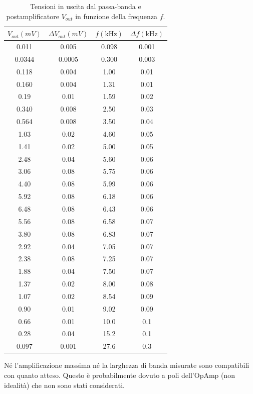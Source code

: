 \documentclass[10pt,a4paper]{article}
\begin{document}
\begin{table}[!htb]\centering
\begin{tabular}{|c|c|c|c|}
\hline
$V_{out} (mV)$ & $\Delta V_{out} (mV)$ & $f (\mbox{kHz})$ & $\Delta f (\mbox{kHz})$\\ 
\hline
0.011 & 0.005 & 0.098 & 0.001\\
0.0344 & 0.0005 & 0.300 & 0.003\\
0.118 & 0.004 & 1.00 & 0.01\\
0.160 & 0.004 & 1.31 & 0.01\\
0.19 & 0.01 & 1.59 & 0.02\\
0.340 & 0.008 & 2.50 & 0.03\\
0.564 & 0.008 & 3.50 & 0.04\\
1.03 & 0.02 & 4.60 & 0.05\\
1.41 & 0.02 & 5.00 & 0.05\\
2.48 & 0.04 & 5.60 & 0.06\\
3.06 & 0.08 & 5.75 & 0.06\\
4.40 & 0.08 & 5.99 & 0.06\\
5.92 & 0.08 & 6.18 & 0.06\\
6.48 & 0.08 & 6.43 & 0.06\\
5.56 & 0.08 & 6.58 & 0.07\\
3.80 & 0.08 & 6.83 & 0.07\\
2.92 & 0.04 & 7.05 & 0.07\\
2.38 & 0.08 & 7.25 & 0.07\\
1.88 & 0.04 & 7.50 & 0.07\\
1.37 & 0.02 & 8.00 & 0.08\\
1.07 & 0.02 & 8.54 & 0.09\\
0.90 & 0.01 & 9.02 & 0.09\\
0.66 & 0.01 & 10.0 & 0.1\\
0.28 & 0.04 & 15.2 & 0.1\\
0.097 & 0.001 & 27.6 & 0.3\\
\hline
\end{tabular}
\caption{Tensioni in uscita dal passa-banda e postamplificatore $V_{out}$ in funzione della frequenza $f$.}
\label{tabellaBode2}
\end{table}


Né l'amplificazione massima né la larghezza di banda misurate sono compatibili con quanto atteso. Questo è probabilmente dovuto a poli dell'OpAmp (non idealità) che non sono stati considerati.
\end{document}
